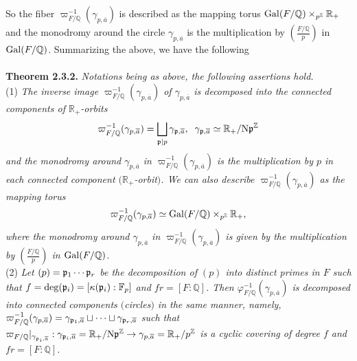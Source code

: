 \documentclass[12pt, leqno]{article}
\begin{document}
So the fiber $\varpi_{F/\mathbb{Q}}^{-1}(\gamma_{p, \overline{a}})$ is described as the mapping torus ${\rm Gal}(F/\mathbb{Q}) \times_{p^{\mathbb{Z}}}  \mathbb{R}_+$ and the monodromy around the circle $\gamma_{p, \overline{a}}$ is the multiplication by $\displaystyle{\left( \frac{F/\mathbb{Q}}{p} \right)}$ in ${\rm Gal}(F/\mathbb{Q})$. Summarizing the above, we have the following\\
\\
{\bf Theorem 2.3.2.} {\it Notations being as above, the following assertions hold.} \\
(1) {\it  The inverse image $\varpi_{F/\mathbb{Q}}^{-1}(\gamma_{p, \overline{a}})$ of $\gamma_{p, \overline{a}}$ is decomposed into the connected components of $\mathbb{R}_+$-orbits}\\
$$ \varpi_{F/\mathbb{Q}}^{-1}(\gamma_{p, \overline{a}})  = \bigsqcup_{\frak{p} \mid p} \gamma_{\frak{p}, \overline{a}}, \;\; \gamma_{\frak{p}, \overline{a}} \simeq \mathbb{R}_+/{\rm N}\frak{p}^{\mathbb{Z}}$$
{\it and the monodromy around $\gamma_{p, \overline{a}}$ in $\varpi_{F/\mathbb{Q}}^{-1}(\gamma_{p, \overline{a}})$ is the multiplication by
$p$ in each connected component $(\mathbb{R}_+$-orbit$)$. {\it  We can also describe  $\varpi_{F/\mathbb{Q}}^{-1}(\gamma_{p, \overline{a}})$ as the mapping torus}
$$\varpi_{F/\mathbb{Q}}^{-1}(\gamma_{p, \overline{a}})   \simeq {\rm Gal}(F/\mathbb{Q}) \times_{p^{\mathbb{Z}}}  \mathbb{R}_+, $$
where the monodromy  around $\gamma_{p, \overline{a}}$ in $\varpi_{F/\mathbb{Q}}^{-1}(\gamma_{p, \overline{a}})$  is given by the multiplication by $\displaystyle{\left( \frac{F/\mathbb{Q}}{p} \right)}$ in ${\rm Gal}(F/\mathbb{Q})$.  } \\
(2) {\it Let $(p) = \frak{p}_1 \cdots \frak{p}_r$ be the decomposition of $(p)$ into distinct primes in $F$ such that $f = {\rm deg}(\frak{p}_i) = [\kappa(\frak{p}_i) : \mathbb{F}_p]$ and $fr = [F:\mathbb{Q}]$. Then $\varphi_{F/\mathbb{Q}}^{-1}(\gamma_{p, \overline{a}})$ is decomposed into connected components $($circles$)$ in the same manner, namely, 
$\varpi_{F/\mathbb{Q}}^{-1}(\gamma_{p, \overline{a}}) = \gamma_{\frak{p}_1, \overline{a}}  \sqcup \cdots \sqcup \gamma_{\frak{p}_r, \overline{a}} $
 such that $\varpi_{F/\mathbb{Q}}|_{\gamma_{\frak{p}_i, \overline{a}}} : \gamma_{\frak{p}_i, \overline{a}} = \mathbb{R}_+/{\rm N}\frak{p}^{\mathbb{Z}} \rightarrow \gamma_{p, \overline{a}} = \mathbb{R}_+/p^{\mathbb{Z}}$ is a cyclic covering of degree $f$ and $fr = [F:\mathbb{Q}]$. }\\
\\
\end{document}
